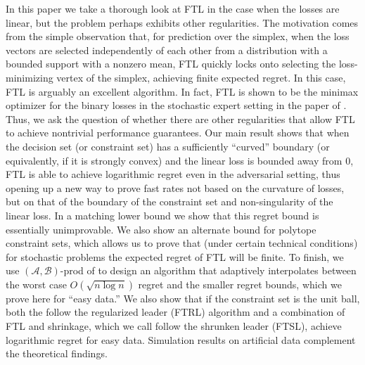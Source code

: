\documentclass[english]{article}
\newcommand{\cA}{\mathcal{A}}
\newcommand{\cB}{\mathcal{B}}
\begin{document}
In this paper we take a thorough look at FTL in the case when the losses are linear, 
but the problem perhaps exhibits other regularities.
The motivation comes from the simple observation that, for prediction over the simplex, when
the loss vectors are selected independently of each other from a distribution with a bounded support with a
nonzero mean, FTL quickly locks onto selecting the loss-minimizing vertex of the simplex, achieving finite expected regret.
In this case, FTL is arguably an excellent algorithm.
In fact, FTL is shown to be the minimax optimizer for the binary losses in the  stochastic expert setting in the paper of \citet{kotlowskiminimax}.
Thus, we ask the question of whether there are other regularities that allow FTL 
to achieve nontrivial performance guarantees.
Our main result shows that when the decision set (or constraint set) has a sufficiently ``curved'' boundary (or equivalently, if it is strongly convex) and the linear loss is bounded away from $0$, FTL 
is able to achieve logarithmic regret even in the adversarial setting, thus opening up a new
way to prove fast rates not based on the curvature of losses, but on that of the boundary of the constraint set and non-singularity of the linear loss.
In a matching lower bound we show that this regret bound is essentially unimprovable.
We also show an alternate bound for polytope constraint sets, which allows us to prove that 
(under certain technical conditions) for stochastic problems the expected regret of FTL will be finite.
To finish, we use $(\cA,\cB)$-prod of \citet{sani2014exploiting} to design an algorithm 
that adaptively interpolates between the worst case $O(\sqrt{n\log n})$ regret and the smaller regret bounds,
which we prove here for ``easy data.'' We also show that if the constraint set is the unit ball, both the follow the regularized leader (FTRL) algorithm and a combination of FTL and shrinkage, which we call follow the shrunken leader (FTSL), achieve logarithmic regret for easy data. Simulation results on artificial data complement the theoretical findings. 
\end{document}
